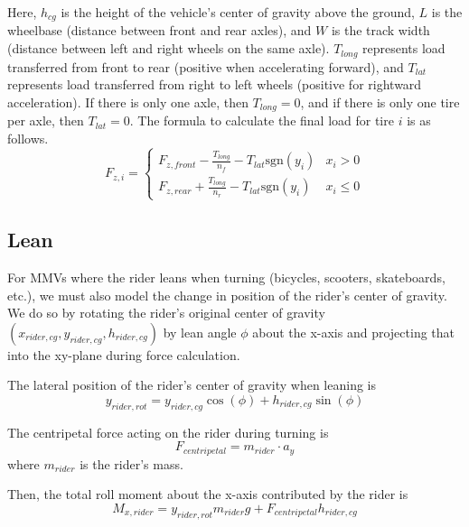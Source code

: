 \documentclass[letterpaper, 10 pt, conference]{ieeeconf}  %
\begin{document}
Here, $h_{cg}$ is the height of the vehicle's center of gravity above the ground, $L$ is the wheelbase (distance between front and rear axles), and $W$ is the track width (distance between left and right wheels on the same axle). $T_{long}$ represents load transferred from front to rear (positive when accelerating forward), and $T_{lat}$ represents load transferred from right to left wheels (positive for rightward acceleration). If there is only one axle, then $T_{long}=0$, and if there is only one tire per axle, then $T_{lat}=0$. The formula to calculate the final load for tire $i$ is as follows.
\begin{equation}
    F_{z,i}= 
    \begin{cases}
        F_{z,front} - \frac{T_{long}}{n_f} - T_{lat}\text{sgn}(y_i) & x_i > 0\\
        F_{z,rear} + \frac{T_{long}}{n_r} - T_{lat}\text{sgn}(y_i) & x_i \le 0
    \end{cases}
\end{equation}

\subsection{Lean}
For MMVs where the rider leans when turning (bicycles, scooters, skateboards, etc.), we must also model the change in position of the rider's center of gravity. We do so by rotating the rider's original center of gravity $(x_{rider,cg}, y_{rider,cg}, h_{rider,cg})$ by lean angle $\phi$ about the x-axis and projecting that into the xy-plane during force calculation. 

The lateral position of the rider's center of gravity when leaning is 
\begin{equation}
    y_{rider,rot} = y_{rider,cg} \cos(\phi) + h_{rider,cg} \sin(\phi)
\end{equation}

The centripetal force acting on the rider during turning is
\begin{equation}
    F_{centripetal} = m_{rider} \cdot a_y
\end{equation}
where $m_{rider}$ is the rider's mass.

Then, the total roll moment about the x-axis contributed by the rider is
\begin{equation}
    M_{x,rider} = y_{rider,rot} m_{rider} g + F_{centripetal} h_{rider,cg}
\end{equation}
\end{document}
